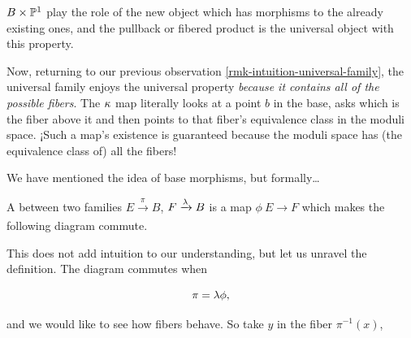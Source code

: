 \documentclass[12pt]{memoir}
\begin{document}
\begin{ptcb}
\begin{center}
    \end{center}
    \(B\times\mathbb{P}^1\) play the role of the new object which has morphisms to the already existing ones, and the pullback or fibered product is the universal object with this property.
\end{ptcb}

\begin{Rmk}
    Now, returning to our previous observation \ref{rmk-intuition-universal-family}, the universal family enjoys the universal property \emph{because it contains all of the possible fibers}. The \(\kappa\) map literally looks at a point \(b\) in the base, asks which is the fiber above it and then points to that fiber's equivalence class in the moduli space. ¡Such a map's existence is guaranteed because the moduli space has (the equivalence class of) all the fibers!
\end{Rmk}

We have mentioned the idea of base morphisms, but formally\dots

\begin{Def}
    A  between two families \(E\xrightarrow[]{\pi}B\), \(F\xrightarrow[]{\lambda}B\) is a map \(\phi\:E\to F\) which makes the following diagram commute.
    \begin{center}
    \end{center}
\end{Def}

This does not add intuition to our understanding, but let us unravel the definition. The diagram commutes when

\[\pi=\lambda\phi,\]

and we would like to see how fibers behave. So take \(y\) in the fiber \(\pi^{-1}(x)\),
\end{document}
